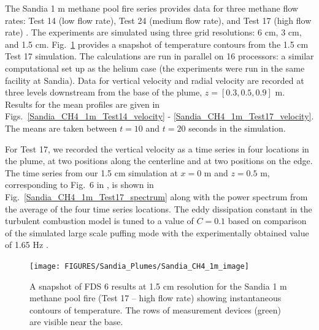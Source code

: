 The Sandia 1 m methane pool fire series provides data for three methane flow rates: Test 14 (low flow rate), Test 24 (medium flow rate), and Test 17 (high flow rate) \cite{Tieszen:2004}.  The experiments are simulated using three grid resolutions: 6 cm, 3 cm, and 1.5 cm.  Fig.~\ref{Sandia_CH4_1m_image} provides a snapshot of temperature contours from the 1.5 cm Test 17 simulation. The calculations are run in parallel on 16 processors: a similar computational set up as the helium case (the experiments were run in the same facility at Sandia).  Data for vertical velocity and radial velocity are recorded at three levels downstream from the base of the plume, $z = [0.3, 0.5, 0.9]$ m.  Results for the mean profiles are given in Figs.~\ref{Sandia_CH4_1m_Test14_velocity} - \ref{Sandia_CH4_1m_Test17_velocity}.  The means are taken between $t=10$ and $t=20$ seconds in the simulation.

For Test 17, we recorded the vertical velocity as a time series in four locations in the plume, at two positions along the centerline and at two positions on the edge.  The time series from our 1.5 cm simulation at $x=0$ m and $z=0.5$ m, corresponding to Fig.~6 in \cite{Tieszen:2002}, is shown in Fig.~\ref{Sandia_CH4_1m_Test17_spectrum} along with the power spectrum from the average of the four time series locations.  The eddy dissipation constant in the turbulent combustion model is tuned to a value of $C = 0.1$ based on comparison of the simulated large scale puffing mode with the experimentally obtained value of 1.65 Hz \cite{Tieszen:2002}.

\begin{figure}[h]
\begin{center}
\texttt{[image: FIGURES/Sandia\_Plumes/Sandia\_CH4\_1m\_image]}
\caption[Sandia 1~m methane pool fire instantaneous temperature contours.]{A snapshot of FDS 6 results at 1.5 cm resolution for the Sandia 1 m methane pool fire (Test 17 -- high flow rate) showing instantaneous contours of temperature.  The rows of measurement devices (green) are visible near the base.}
\label{Sandia_CH4_1m_image}
\end{center}
\end{figure}

